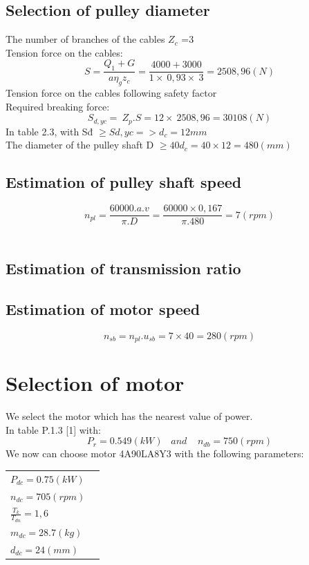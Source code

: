 \subsection{Selection of pulley diameter}
The number of branches of the cables $Z_c$ =3\\
Tension force on the cables:\\
$$S=\frac{Q_1+G}{a\eta_gz_c}=\frac{4000+3000}{1\times\ 0,93\times\ 3}=2508,96 (N)$$
Tension force on the cables following safety factor\\
Required breaking force:
$$S_{d,yc} = \ Z_p.S=12\times\ 2508,96=30108 (N) $$
In table 2.3, with Sđ $ \geq Sd,yc  => d_c = 12 mm $ \\
The diameter of the pulley shaft D $ \geq 40d_c =40\times12 = 480 (mm) $
\subsection{Estimation of pulley shaft speed }
$$n_{pl}=\frac{60000.a.v}{\pi.D}=\frac{60000\times0,167}{\pi.480}=7 (rpm)$$ \\
\subsection{Estimation of transmission ratio}

\subsection{Estimation of motor speed}
$$n_{sb}=n_{pl}.u_{sb}=7\times 40 = 280 (rpm)$$
\section {Selection of motor}
We select the motor which has the nearest value of power. \\
In table P.1.3 [1] with: \\
        	 $$	 P_r = 0.549 (kW) \;\;\; and \;\;\;\;
         		 n_{db} = 750 (rpm) $$
We now can choose motor 4A90LA8Y3 with the following parameters: 
\begin{table}[H]
    \centering
    \begin{tabular}{l l}
        $	P_{dc} = 0.75 (kW) $  \\
        $ n_{dc} = 705 (rpm)   $ \\
        $\frac{T_k}{T_{dn}}= 1,6$ \\
        $m_{dc} = 28.7   (kg)  $\\ 
        $d_{dc} =  24 (mm) $\\
    \end{tabular}
\end{table}

